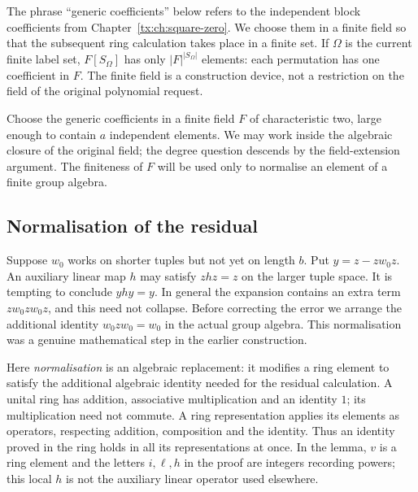 The phrase ``generic coefficients'' below refers to the independent
block coefficients from Chapter~\ref{tx:ch:square-zero}. We choose
them in a finite field so that the subsequent ring calculation takes
place in a finite set. If $\Omega$ is the current finite label set,
$F[S_\Omega]$ has only $|F|^{|S_\Omega|}$ elements: each permutation
has one coefficient in $F$. The finite field is a construction device,
not a restriction on the field of the original polynomial request.

Choose the generic coefficients in a finite field $F$ of characteristic two, large enough to contain $a$ independent elements. We may work inside the algebraic closure of the original field; the degree question descends by the field-extension argument. The finiteness of $F$ will be used only to normalise an element of a finite group algebra.

\subsection{Normalisation of the residual}
Suppose $w_0$ works on shorter tuples but not yet on length $b$. Put $y=z-zw_0z$. An auxiliary linear map $h$ may satisfy $zhz=z$ on the larger tuple space. It is tempting to conclude $yhy=y$. In general the expansion contains an extra term $zw_0zw_0z$, and this need not collapse. Before correcting the error we arrange the additional identity $w_0zw_0=w_0$ in the actual group algebra. This normalisation was a genuine mathematical step in the earlier construction.

Here \emph{normalisation} is an algebraic replacement: it modifies
a ring element to satisfy the
additional algebraic identity needed for the residual calculation.
A unital ring has addition, associative multiplication and an identity
$1$; its multiplication need not commute. A ring representation applies
its elements as operators, respecting addition, composition and the
identity. Thus an identity proved in the ring holds in all its
representations at once. In the lemma, $v$ is a ring element and
the letters $i,\ell,h$ in the proof are integers recording powers;
this local $h$ is not the auxiliary linear operator used elsewhere.

